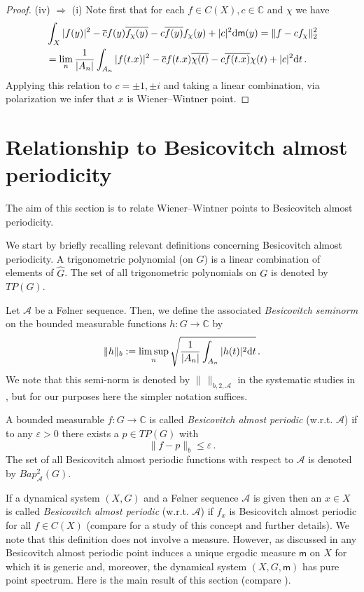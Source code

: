\documentclass [14pt]{amsart}
\numberwithin{equation}{section}
\newcommand{\CC}{{\mathbb C}}
\newcommand{\cA}{{\mathcal A}}
\newcommand{\mm}{\mathsf{m}}
\newcommand{\dd}{\mbox{\rm d}}
\newcommand{\bap}{Bap}
\begin{document}
\begin{proof}
\medskip (iv) $\Longrightarrow$ (i)
Note first that for each $f \in C(X), c \in \CC$ and $\chi$ we have
\begin{align*}
&\int_{X} |f(y)|^2   -   \overline{c} f(y) \overline{f_\chi(y)} - c \overline{f(y)} f_\chi(y) +|c|^2 \dd \mm(y) =\| f-  c f_{\chi} \|^2_2\\
&= \lim_n  \frac{1}{|A_n|} \int_{A_n} |f(t.x)|^2 -\overline{c} f(t.x)\overline{\chi(t)} - c \overline{f(t.x)} \chi(t) + |c|^2 \dd t \,.
\end{align*}
Applying this relation to $c=\pm 1, \pm i$ and taking a linear combination, via polarization we infer that $x$ is Wiener--Wintner point.
\end{proof}





\section{Relationship to  Besicovitch almost periodicity}
\label{sec-Besicovitch}

The aim of this section is to relate Wiener--Wintner points to Besicovitch almost periodicity.

\medskip

We start by briefly recalling relevant definitions concerning Besicovitch almost periodicity. A trigonometric polynomial (on $G$) is a linear combination of elements of $\widehat{G}$. The set of all trigonometric polynomials on $G$ is denoted by $TP(G)$.

Let $\cA$ be a F\o lner sequence. Then, we define the associated \textit{Besicovitch seminorm}  on the bounded measurable functions $h: G\longrightarrow \CC$ by
$$\|h\|_{b} :=\limsup_n \sqrt{\frac{1}{|A_n|} \int_{A_n} |h(t)|^2 \dd t} \,.$$
We note  that this semi-norm is  denoted by $\| \, \|_{b,2,\cA}$ in the systematic studies in \cite{ LSS,LSS2}, but for our purposes here the simpler notation suffices.

A bounded measurable  $f : G\longrightarrow \CC$ is called \textit{Besicovitch almost periodic} (w.r.t. $\cA$)  if to any $\varepsilon >0$ there exists a $p\in TP(G)$  with
$$\|f - p\|_{b} \leq \varepsilon \,.$$
The set of all Besicovitch almost periodic functions with respect to $\cA$ is denoted by $\bap^2_{\cA}(G)$.

If a dynamical system $(X,G)$ and a F\o lner sequence $\cA$  is given  then an $x\in X$ is called \textit{Besicovitch almost periodic} (w.r.t. $\cA$)   if $f_x$ is Besicovitch almost periodic for all $f\in C(X)$ (compare \cite{LSS2} for a study of this concept and further details).  We note that this definition does not involve a measure. However, as discussed in \cite{LSS2} any Besicovitch almost periodic point induces a unique ergodic measure $\mm$ on $X$ for which it is generic and, moreover, the dynamical system $(X,G,\mm)$ has pure point spectrum.  Here is the main result of this section (compare \cite{LSS2}).
\end{document}
